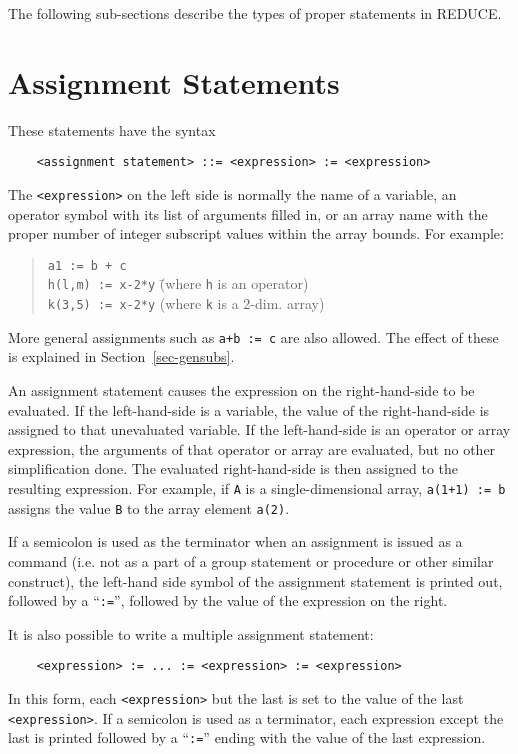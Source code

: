 \documentclass[11pt,letterpaper]{book}
\newcommand{\REDUCE}{REDUCE}
\begin{document}
The following sub-sections describe the types of proper statements
 in {\REDUCE}.

\section{Assignment Statements}

These statements have the syntax
{\small\begin{verbatim}
    <assignment statement> ::= <expression> := <expression>
\end{verbatim}}
The {\tt <expression>} on the left side is normally the name of a variable, an
operator symbol with its list of arguments filled in, or an array name with
the proper number of integer subscript values within the array bounds. For
example:
\begin{quote}
\begin{tabbing}
{\tt a1 := b + c} \\
{\tt h(l,m) := x-2*y} \hspace{1in} \= (where {\tt h} is an operator) \\
{\tt k(3,5) := x-2*y} \> (where {\tt k} is a 2-dim. array)
\end{tabbing}
\end{quote}
More general assignments such as {\tt a+b := c} are also
allowed.  The effect of these is explained in Section~\ref{sec-gensubs}.

An assignment statement causes the expression on the right-hand-side to be
evaluated.  If the left-hand-side is a variable, the value of the
right-hand-side is assigned to that unevaluated variable.  If the
left-hand-side is an operator or array expression, the arguments of that
operator or array are evaluated, but no other simplification done.  The
evaluated right-hand-side is then assigned to the resulting expression.
For example, if {\tt A} is a single-dimensional array, {\tt a(1+1) := b}
assigns the value {\tt B} to the array element {\tt a(2)}.

If a semicolon is used as the terminator when an assignment
 is issued as a command (i.e. not as a part of a group
statement or procedure or other similar construct), the left-hand side
symbol of the assignment statement is printed out, followed by a
``{\tt :=}'', followed by the value of the expression on the right.

It is also possible to write a multiple assignment statement:
{\small\begin{verbatim}
    <expression> := ... := <expression> := <expression>
\end{verbatim}}
In this form, each {\tt <expression>} but the last is set to the value of
the last {\tt <expression>}.  If a semicolon is used as a terminator, each
expression except the last is printed followed by a ``{\tt :=}'' ending
with the value of the last expression.
\end{document}
